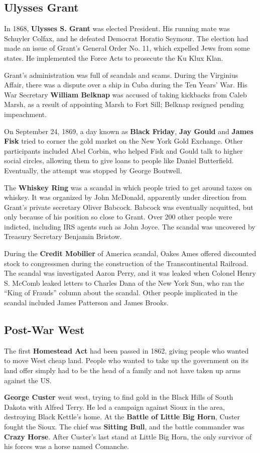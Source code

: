 \subsection*{Ulysses Grant}

In 1868, \textbf{Ulysses S. Grant} was elected President.
His running mate was Schuyler Colfax, and he defeated Democrat Horatio Seymour.
The election had made an issue of Grant's General Order No. 11, which expelled Jews from some states.
He implemented the Force Acts to prosecute the Ku Klux Klan.

Grant's administration was full of scandals and scams.
During the Virginius Affair, there was a dispute over a ship in Cuba during the Ten Years' War.
His War Secretary \textbf{William Belknap} was accused of taking kickbacks from Caleb Marsh,
as a result of appointing Marsh to Fort Sill;
Belknap resigned pending impeachment.

On September 24, 1869, a day known as \textbf{Black Friday},
\textbf{Jay Gould} and \textbf{James Fisk} tried to corner the gold market on the New York Gold Exchange.
Other participants included Abel Corbin, who helped Fisk and Gould talk to higher social circles,
allowing them to give loans to people like Daniel Butterfield.
Eventually, the attempt was stopped by George Boutwell.

The \textbf{Whiskey Ring} was a scandal in which people tried to get around taxes on whiskey.
It was organized by John McDonald, apparently under direction from Grant's private secretary Oliver Babcock.
Babcock was eventually acquitted, but only because of his position so close to Grant.
Over 200 other people were indicted, including IRS agents such as John Joyce.
The scandal was uncovered by Treasury Secretary Benjamin Bristow.

During the \textbf{Credit Mobilier} of America scandal,
Oakes Ames offered discounted stock to congressmen during the construction of the Transcontinental Railroad.
The scandal was investigated Aaron Perry,
and it was leaked when Colonel Henry S. McComb leaked letters to Charles Dana of the New York Sun,
who ran the ``King of Frauds'' column about the scandal.
Other people implicated in the scandal included James Patterson and James Brooks.

\subsection*{Post-War West}

The first \textbf{Homestead Act} had been passed in 1862, giving people who wanted to move West cheap land.
People who wanted to take up the government on its land offer simply had to be the head of a family
and not have taken up arms against the US\@.

\textbf{George Custer} went west, trying to find gold in the Black Hills of South Dakota with Alfred Terry.
He led a campaign against Sioux in the area, destroying Black Kettle's home.
At the \textbf{Battle of Little Big Horn}, Custer fought the Sioux.
The chief was \textbf{Sitting Bull}, and the battle commander was \textbf{Crazy Horse}.
After Custer's last stand at Little Big Horn, the only survivor of his forces was a horse named Comanche.
